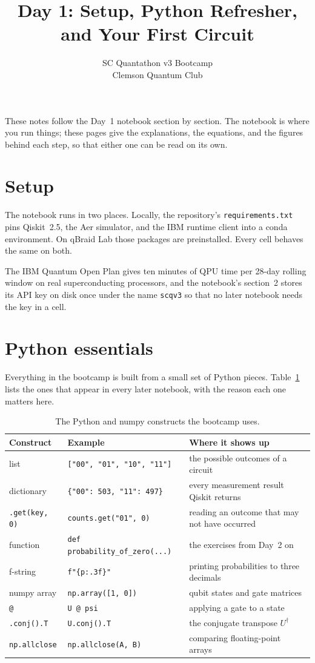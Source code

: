 \documentclass[11pt]{article}
\title{Day 1: Setup, Python Refresher, and Your First Circuit}
\author{SC Quantathon v3 Bootcamp \\ Clemson Quantum Club}
\date{}
\newcommand{\code}[1]{\texttt{#1}}
\begin{document}
\maketitle

\noindent
These notes follow the Day~1 notebook section by section. The notebook is where you run things; these pages give the explanations, the equations, and the figures behind each step, so that either one can be read on its own.


\section{Setup}

The notebook runs in two places. Locally, the repository's \code{requirements.txt} pins Qiskit~2.5, the Aer simulator, and the IBM runtime client into a conda environment. On qBraid Lab those packages are preinstalled. Every cell behaves the same on both.

The IBM Quantum Open Plan gives ten minutes of QPU time per 28-day rolling window on real superconducting processors, and the notebook's section~2 stores its API key on disk once under the name \code{scqv3} so that no later notebook needs the key in a cell.

\section{Python essentials}

Everything in the bootcamp is built from a small set of Python pieces. Table~\ref{tab:python} lists the ones that appear in every later notebook, with the reason each one matters here.

\begin{table}[h]
\centering
\small
\begin{tabular}{@{}lll@{}}
\toprule
Construct & Example & Where it shows up \\
\midrule
list & \code{["00", "01", "10", "11"]} & the possible outcomes of a circuit \\
dictionary & \code{\{"00": 503, "11": 497\}} & every measurement result Qiskit returns \\
\code{.get(key, 0)} & \code{counts.get("01", 0)} & reading an outcome that may not have occurred \\
function & \code{def probability\_of\_zero(...)} & the exercises from Day~2 on \\
f-string & \code{f"\{p:.3f\}"} & printing probabilities to three decimals \\
numpy array & \code{np.array([1, 0])} & qubit states and gate matrices \\
\code{@} & \code{U @ psi} & applying a gate to a state \\
\code{.conj().T} & \code{U.conj().T} & the conjugate transpose $U^\dagger$ \\
\code{np.allclose} & \code{np.allclose(A, B)} & comparing floating-point arrays \\
\bottomrule
\end{tabular}
\caption{The Python and numpy constructs the bootcamp uses.}
\label{tab:python}
\end{table}
\end{document}
